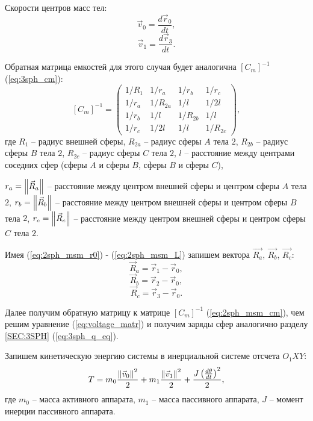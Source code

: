 Скорости центров масс тел:
\begin{equation}
\label{eq:2sph_msm_v0}
	\vec{v}_0 = \frac{d \vec{r}_0}{dt},
\end{equation}
\begin{equation}
\label{eq:2sph_msm_v1}
	\vec{v}_1 = \frac{d \vec{r}_3}{dt}.
\end{equation}

Обратная матрица емкостей для этого случая будет аналогична $[C_m]^{-1}$ (\ref{eq:3sph_cm}):
\begin{equation}
\label{eq:2sph_msm_cm}
	[C_m]^{-1} = 
	\begin{pmatrix}
		1/R_1	&	1/r_a	&	1/r_b	&	1/r_c\\
		1/r_a	&	1/R_{2a}	&	1/l		&	1/2l\\
		1/r_b	&	1/l		&	1/R_{2b}	&	1/l\\
		1/r_c	&	1/2l		&	1/l		&	1/R_{2c}
	\end{pmatrix},
\end{equation}
где $R_1$ – радиус внешней сферы, $R_{2a}$ – радиус сферы $A$ тела $2$, $R_{2b}$ – радиус сферы $B$ тела $2$, $R_{2c}$ – радиус сферы $C$ тела $2$, $l$ – расстояние между центрами соседних сфер (сферы $A$ и сферы $B$, сферы $B$ и сферы $C$),

\noindent $r_a = \left\lVert\vec{R}_a\right\rVert$ – расстояние между центром внешней сферы и центром сферы $A$ тела $2$, $r_b = \left\lVert\vec{R}_b\right\rVert$ – расстояние между центром внешней сферы и центром сферы $B$ тела $2$, $r_c = \left\lVert\vec{R}_c\right\rVert$ – расстояние между центром внешней сферы и центром сферы $C$ тела $2$.

Имея (\ref{eq:2sph_msm_r0}) - (\ref{eq:2sph_msm_L}) запишем вектора $\vec{R_a}$, $\vec{R_b}$, $\vec{R_c}$:
\begin{equation}
\label{eq:2sph_msm_Ra}
	\vec{R}_a = \vec{r}_1 - \vec{r}_0,
\end{equation}
\begin{equation}
\label{eq:2sph_msm_Rb}
	\vec{R}_b = \vec{r}_2 - \vec{r}_0,
\end{equation}
\begin{equation}
\label{eq:2sph_msm_Rc}
	\vec{R}_c = \vec{r}_3 - \vec{r}_0.
\end{equation}

Далее получим обратную матрицу к матрице $[C_m]^{-1}$ (\ref{eq:2sph_msm_cm}), чем решим уравнение (\ref{eq:voltage_matr}) и получим заряды сфер аналогично разделу \ref{SEC:3SPH} (\ref{eq:3sph_q_eq}).

Запишем кинетическую энергию системы в инерциальной системе отсчета $O_1XY$:
\begin{equation}
\label{eq:2sph_msm_T}
	T = m_0 \frac{\left\lVert\vec{v}_0\right\rVert^2}{2} + m_1 \frac{\left\lVert\vec{v}_1\right\rVert^2}{2} + \frac{J\left(\frac{d\theta}{dt}\right)^2}{2},
\end{equation}
где $m_0$ – масса активного аппарата, $m_1$ – масса пассивного аппарата, $J$ – момент инерции пассивного аппарата.

